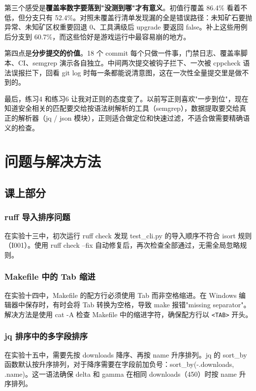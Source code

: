 \documentclass[UTF8]{ctexart}
\begin{document}
第三个感受是\textbf{覆盖率数字要落到"没测到哪"才有意义}。初值行覆盖 86.4\% 看着不低，但分支只有 52.4\%。对照未覆盖行清单发现漏的全是错误路径：未知矿石要抛异常、未知矿区权重要回退 0、工具满级后 upgrade 要返回 false。补上这些用例后分支到 60.7\%，而这些恰好是游戏运行中最容易崩的地方。

第四点是\textbf{分步提交的价值}。18 个 commit 每个只做一件事，门禁日志、覆盖率脚本、CI、semgrep 演示各自独立。中间两次提交被钩子拦下、一次被 cppcheck 语法误报拦下，回看 git log 时每一条都能说清意图，这在一次性全量提交里是做不到的。

最后，练习4 和练习6 让我对正则的态度变了。以前写正则喜欢"一步到位"，现在知道安全相关的匹配要交给按语法树解析的工具（semgrep），数据提取要交给真正的解析器（jq / json 模块），正则适合做定位和快速过滤，不适合做需要精确语义的检查。

\section{问题与解决方法}

\subsection{课上部分}

\subsubsection{ruff 导入排序问题}

在实验十三中，初次运行 ruff check 发现 test\_cli.py 的导入顺序不符合 isort 规则（I001）。使用 ruff check --fix 自动修复后，再次检查全部通过，无需全局忽略规则。

\subsubsection{Makefile 中的 Tab 缩进}

在实验十四中，Makefile 的配方行必须使用 Tab 而非空格缩进。在 Windows 编辑器中保存时，有时会将 Tab 转换为空格，导致 make 报错"missing separator"。解决方法是使用 cat -A 检查 Makefile 中的缩进字符，确保配方行以 \texttt{<TAB>} 开头。

\subsubsection{jq 排序中的多字段排序}

在实验十五中，需要先按 downloads 降序、再按 name 升序排列。jq 的 sort\_by 函数默认按升序排列，对于降序需要在字段前加负号：sort\_by(-.downloads, .name)。这一语法确保 delta 和 gamma 在相同 downloads（450）时按 name 升序排列。
\end{document}
